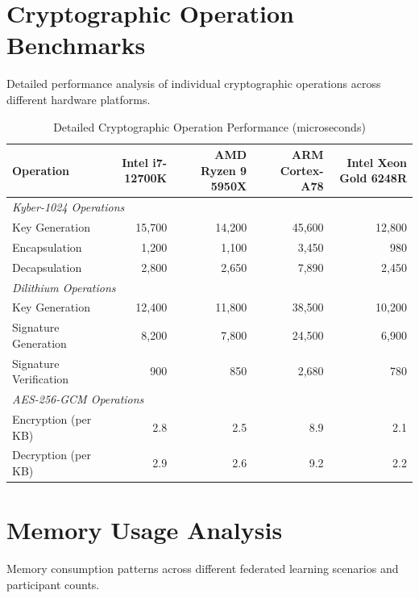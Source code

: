 \documentclass[12pt,a4paper,twoside]{book}
\begin{document}
\section{Cryptographic Operation Benchmarks}
\label{sec:crypto-benchmarks}

Detailed performance analysis of individual cryptographic operations across different hardware platforms.

\begin{table}[htbp]
\centering
\caption{Detailed Cryptographic Operation Performance (microseconds)}
\label{tab:detailed-crypto-performance}
\begin{tabular}{@{}lrrrr@{}}
\toprule
\textbf{Operation} & \textbf{Intel i7-12700K} & \textbf{AMD Ryzen 9 5950X} & \textbf{ARM Cortex-A78} & \textbf{Intel Xeon Gold 6248R} \\
\midrule
\multicolumn{5}{l}{\textit{Kyber-1024 Operations}} \\
Key Generation & 15,700 & 14,200 & 45,600 & 12,800 \\
Encapsulation & 1,200 & 1,100 & 3,450 & 980 \\
Decapsulation & 2,800 & 2,650 & 7,890 & 2,450 \\
\midrule
\multicolumn{5}{l}{\textit{Dilithium Operations}} \\
Key Generation & 12,400 & 11,800 & 38,500 & 10,200 \\
Signature Generation & 8,200 & 7,800 & 24,500 & 6,900 \\
Signature Verification & 900 & 850 & 2,680 & 780 \\
\midrule
\multicolumn{5}{l}{\textit{AES-256-GCM Operations}} \\
Encryption (per KB) & 2.8 & 2.5 & 8.9 & 2.1 \\
Decryption (per KB) & 2.9 & 2.6 & 9.2 & 2.2 \\
\bottomrule
\end{tabular}
\end{table}

\section{Memory Usage Analysis}
\label{sec:memory-analysis}

Memory consumption patterns across different federated learning scenarios and participant counts.
\end{document}
